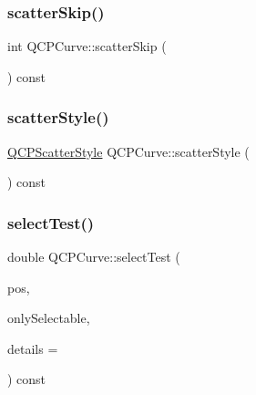 \mbox{\label{class_q_c_p_curve_a09b33217172aedf6c62c441b4ff66166}} 
\subsubsection{\texorpdfstring{scatterSkip()}{scatterSkip()}}
{\footnotesize\ttfamily int Q\+C\+P\+Curve\+::scatter\+Skip (\begin{DoxyParamCaption}{ }\end{DoxyParamCaption}) const\hspace{0.3cm}{\ttfamily [inline]}}

\mbox{\label{class_q_c_p_curve_afa6bd72a3a331a5ed45d3e0c5843b592}} 
\subsubsection{\texorpdfstring{scatterStyle()}{scatterStyle()}}
{\footnotesize\ttfamily \mbox{\hyperlink{class_q_c_p_scatter_style}{Q\+C\+P\+Scatter\+Style}} Q\+C\+P\+Curve\+::scatter\+Style (\begin{DoxyParamCaption}{ }\end{DoxyParamCaption}) const\hspace{0.3cm}{\ttfamily [inline]}}

\mbox{\label{class_q_c_p_curve_a0ed9b7e6b4bc72010d6fcd974af46a8b}} 
\subsubsection{\texorpdfstring{selectTest()}{selectTest()}}
{\footnotesize\ttfamily double Q\+C\+P\+Curve\+::select\+Test (\begin{DoxyParamCaption}\item[{const Q\+PointF \&}]{pos,  }\item[{bool}]{only\+Selectable,  }\item[{Q\+Variant $\ast$}]{details = {} }\end{DoxyParamCaption}) const\hspace{0.3cm}{\ttfamily [virtual]}}

